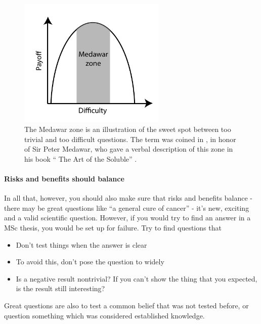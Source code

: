 \documentclass{tufte-book}
\begin{document}
\begin{figure}[]
\begin{center}
\includegraphics[width = 7cm]{figures/MedawarZone}
\caption{The Medawar zone is an illustration of the sweet spot between too trivial and too difficult questions. The term was coined in \citet{Loehle-guidetoincreased-1990}, in honor of Sir Peter Medawar, who gave a verbal description of this zone in his book `` The Art of the Soluble'' \citep{Medawar-artsoluble-1967}.}
\label{fig: MedawarZone}
\end{center}
\end{figure}

\paragraph{Risks and benefits should balance} In all that, however, you should also make sure that risks and benefits balance - there may be great questions like ``a general cure of cancer'' - it's new, exciting and a valid scientific question. However, if you would try to find an answer in a MSc thesis, you would be set up for failure. Try to find questions that 

\begin{itemize}
\item Don’t test things when the answer is clear
\item To avoid this, don’t pose the question to widely
\item Is a negative result nontrivial? If you can’t show the thing that you expected, is the result still interesting?
\end{itemize}

Great questions are also to test a common belief that was not tested before, or question something which was considered established knowledge. 
\end{document}
